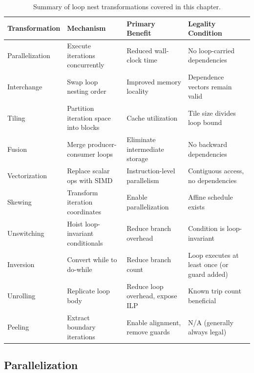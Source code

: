 \begin{table}[H]
    \centering
    \caption{Summary of loop nest transformations covered in this chapter.}
    \label{tab:loop-transformations}
    \begin{tabularx}{\textwidth}{l >{\raggedright\arraybackslash}p{3.5cm} >{\raggedright\arraybackslash}p{4cm} >{\raggedright\arraybackslash}p{4cm}}
        \toprule
        \textbf{Transformation} & \textbf{Mechanism} & \textbf{Primary Benefit} & \textbf{Legality Condition} \\
        \midrule
        Parallelization & Execute iterations concurrently & Reduced wall-clock time & No loop-carried dependencies \\
        \addlinespace
        Interchange & Swap loop nesting order & Improved memory locality & Dependence vectors remain valid \\
        \addlinespace
        Tiling & Partition iteration space into blocks & Cache utilization & Tile size divides loop bound \\
        \addlinespace
        Fusion & Merge producer-consumer loops & Eliminate intermediate storage & No backward dependencies \\
        \addlinespace
        Vectorization & Replace scalar ops with SIMD & Instruction-level parallelism & Contiguous access, no dependencies \\
        \addlinespace
        Skewing & Transform iteration coordinates & Enable parallelization & Affine schedule exists \\
        \addlinespace
        Unswitching & Hoist loop-invariant conditionals & Reduce branch overhead & Condition is loop-invariant \\
        \addlinespace
        Inversion & Convert while to do-while & Reduce branch count & Loop executes at least once (or guard added) \\
        \addlinespace
        Unrolling & Replicate loop body & Reduce loop overhead, expose ILP & Known trip count beneficial \\
        \addlinespace
        Peeling & Extract boundary iterations & Enable alignment, remove guards & N/A (generally always legal) \\
        \bottomrule
    \end{tabularx}
\end{table}

\subsection{Parallelization}

